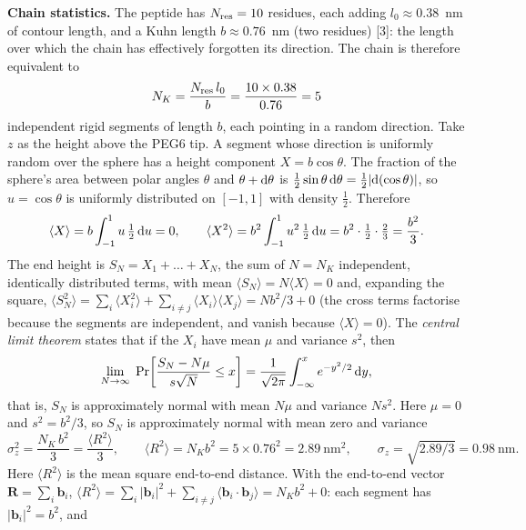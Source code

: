 \documentclass[10pt,a4paper]{article}
\numberwithin{equation}{section}
\newcommand{\cit}[1]{[#1]}
\newcommand{\Rsq}{2.89}
\newcommand{\nKuhn}{5}
\newcommand{\sigmaZ}{0.98}
\begin{document}
\textbf{Chain statistics.} The peptide has $N_{\rm res}=10$ residues, each
adding $l_0\approx0.38$~nm of contour length, and a Kuhn length $b\approx0.76$~nm
(two residues) \cit{3}: the length over which the chain has effectively forgotten
its direction. The chain is therefore equivalent to
\begin{equation}
  N_K=\frac{N_{\rm res}\,l_0}{b}=\frac{10\times0.38}{0.76}=\nKuhn
  \label{eq:NK}
\end{equation}
independent rigid segments of length $b$, each pointing in a random direction. Take $z$ as the
height above the PEG6 tip. A segment whose direction is uniformly random over the sphere has a
height component $X=b\cos\theta$. The fraction of the sphere's area between polar angles $\theta$ and $\theta+{\rm d}\theta$
is $\tfrac12\sin\theta\,{\rm d}\theta=\tfrac12|{\rm d}(\cos\theta)|$, so $u=\cos\theta$ is uniformly distributed on $[-1,1]$
with density $\tfrac12$. Therefore
\[
  \langle X\rangle=b\int_{-1}^{1}u\,\tfrac12\,{\rm d}u=0,\qquad
  \langle X^2\rangle=b^2\int_{-1}^{1}u^2\,\tfrac12\,{\rm d}u=b^2\cdot\tfrac12\cdot\tfrac{2}{3}=\frac{b^2}{3}.
\]
The end height is $S_N=X_1+\dots+X_N$, the sum of $N=N_K$ independent, identically distributed terms, with mean
$\langle S_N\rangle=N\langle X\rangle=0$ and, expanding the square,
$\langle S_N^2\rangle=\sum_i\langle X_i^2\rangle+\sum_{i\ne j}\langle X_i\rangle\langle X_j\rangle=Nb^2/3+0$ (the cross terms factorise
because the segments are independent, and vanish because $\langle X\rangle=0$). The
\emph{central limit theorem} states that if the $X_i$ have mean $\mu$ and variance $s^2$, then
\begin{equation}
  \lim_{N\to\infty}\;\Pr\!\left[\frac{S_N-N\mu}{s\sqrt N}\le x\right]=\frac{1}{\sqrt{2\pi}}\int_{-\infty}^{x}e^{-y^2/2}\,{\rm d}y ,
  \label{eq:clt}
\end{equation}
that is, $S_N$ is approximately normal with mean $N\mu$ and variance $Ns^2$. Here $\mu=0$ and $s^2=b^2/3$, so
$S_N$ is approximately normal with mean zero and variance
\begin{equation}
  \sigma_z^2=\frac{N_K\,b^2}{3}=\frac{\langle R^2\rangle}{3},\qquad
  \langle R^2\rangle=N_Kb^2=5\times0.76^2=\Rsq~\text{nm}^2,\qquad \sigma_z=\sqrt{\Rsq/3}=\sigmaZ~\text{nm}.
  \label{eq:sigmaz}
\end{equation}
Here $\langle R^2\rangle$ is the mean square end-to-end distance. With the end-to-end vector $\mathbf R=\sum_i\mathbf b_i$,
$\langle R^2\rangle=\sum_i|\mathbf b_i|^2+\sum_{i\ne j}\langle\mathbf b_i\cdot\mathbf b_j\rangle=N_Kb^2+0$: each segment has $|\mathbf b_i|^2=b^2$, and
\end{document}
